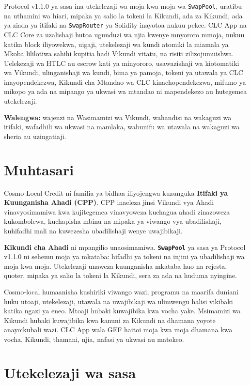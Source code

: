 \documentclass[11pt]{article}
\begin{document}
Protocol v1.1.0 ya sasa ina utekelezaji wa moja kwa moja wa \texttt{SwapPool}, uratibu na uthamini wa hiari, mipaka ya salio la tokeni la Kikundi, ada za Kikundi, ada ya ziada ya itifaki na \texttt{SwapRouter} ya Solidity inayotoa nukuu pekee. CLC App na CLC Core za uzalishaji hutoa ugunduzi wa njia kwenye mnyororo mmoja, nukuu katika block iliyowekwa, uigaji, utekelezaji wa kundi atomiki la miamala ya Mkoba lililotiwa sahihi kupitia hadi Vikundi vitatu, na risiti zilizojumuishwa. Uelekezaji wa HTLC au escrow kati ya minyororo, usawazishaji wa kiotomatiki wa Vikundi, ulinganishaji wa kundi, bima ya pamoja, tokeni ya utawala ya CLC inayopendekezwa, Kikundi cha Mtandao wa CLC kinachopendekezwa, mifumo ya mikopo ya ada na mipango ya ukwasi wa mtandao ni mapendekezo au hutegemea utekelezaji.

\textbf{Walengwa:} wajenzi na Wasimamizi wa Vikundi, wahandisi na wakaguzi wa itifaki, wafadhili wa ukwasi na mamlaka, wabunifu wa utawala na wakaguzi wa sheria au uzingatiaji.

\section*{Muhtasari}

Cosmo-Local Credit ni familia ya bidhaa iliyojengwa kuzunguka \textbf{Itifaki ya Kuunganisha Ahadi (CPP)}. CPP inaeleza jinsi Vikundi vya Ahadi vinavyosimamiwa kwa kujitegemea vinavyoweza kuchagua ahadi zinazoweza kukombolewa, kuchapisha mbinu na mipaka ya viwango vya ubadilishaji, kuhifadhi mali na kuwezesha ubadilishaji wenye uwajibikaji.

\textbf{Kikundi cha Ahadi } ni mpangilio unaosimamiwa. \textbf{\texttt{SwapPool}} ya sasa ya Protocol v1.1.0 ni sehemu moja ya mkataba: hifadhi ya tokeni na injini ya ubadilishaji wa moja kwa moja. Utekelezaji unaweza kuunganisha mkataba huo na rejesta, quoter, mipaka ya salio la tokeni la Kikundi, sera za ada na huduma nyingine.

Cosmo-local humaanisha kushiriki viwango wazi, programu na maarifa duniani huku utoaji, utekelezaji, utawala na uwajibikaji wa ulimwengu halisi vikibaki katika ngazi ya eneo. Mtoaji hubaki kuwajibika kwa vocha yake. Msimamizi wa Kikundi hubaki kuwajibika kwa kanuni za Kikundi na dhamana yoyote anayoikubali wazi. CLC App wala GEF haitoi moja kwa moja dhamana kwa vocha, Kikundi, thamani, njia, nafasi ya ukwasi au matokeo.

\section*{Utekelezaji wa sasa}
\end{document}
